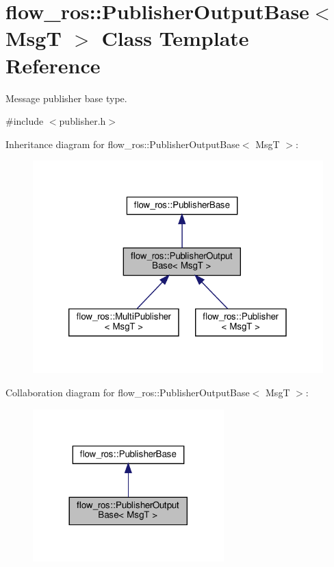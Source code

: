 \hypertarget{classflow__ros_1_1_publisher_output_base}{}\section{flow\+\_\+ros\+:\+:Publisher\+Output\+Base$<$ MsgT $>$ Class Template Reference}
\label{classflow__ros_1_1_publisher_output_base}


Message publisher base type.  




{\ttfamily \#include $<$publisher.\+h$>$}



Inheritance diagram for flow\+\_\+ros\+:\+:Publisher\+Output\+Base$<$ MsgT $>$\+:\nopagebreak
\begin{figure}[H]
\begin{center}
\leavevmode
\includegraphics[width=320pt]{classflow__ros_1_1_publisher_output_base__inherit__graph}
\end{center}
\end{figure}


Collaboration diagram for flow\+\_\+ros\+:\+:Publisher\+Output\+Base$<$ MsgT $>$\+:\nopagebreak
\begin{figure}[H]
\begin{center}
\leavevmode
\includegraphics[width=209pt]{classflow__ros_1_1_publisher_output_base__coll__graph}
\end{center}
\end{figure}
